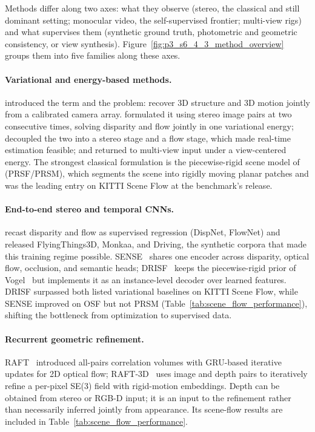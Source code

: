 Methods differ along two axes: what they observe (stereo, the classical and still dominant setting; monocular video, the self-supervised frontier; multi-view rigs) and what supervises them (synthetic ground truth, photometric and geometric consistency, or view synthesis). Figure~\ref{fig:p3_s6_4_3_method_overview} groups them into five families along these axes.

\paragraph{Variational and energy-based methods.}
\citet{vedula1999three} introduced the term and the problem: recover 3D structure and 3D motion jointly from a calibrated camera array. \citet{huguet2007variational} formulated it using stereo image pairs at two consecutive times, solving disparity and flow jointly in one variational energy; \citet{wedel2011stereoscopic} decoupled the two into a stereo stage and a flow stage, which made real-time estimation feasible; and \citet{basha2013multi} returned to multi-view input under a view-centered energy. The strongest classical formulation is the piecewise-rigid scene model of \citet{vogel20153d} (PRSF/PRSM), which segments the scene into rigidly moving planar patches and was the leading entry on KITTI Scene Flow at the benchmark's release.

\paragraph{End-to-end stereo and temporal CNNs.}
\citet{mayer2016large} recast disparity and flow as supervised regression (DispNet, FlowNet) and released FlyingThings3D, Monkaa, and Driving, the synthetic corpora that made this training regime possible. SENSE~\cite{jiang2019sense} shares one encoder across disparity, optical flow, occlusion, and semantic heads; DRISF~\cite{ma2019deep} keeps the piecewise-rigid prior of Vogel \etal\ but implements it as an instance-level decoder over learned features. DRISF surpassed both listed variational baselines on KITTI Scene Flow, while SENSE improved on OSF but not PRSM (Table~\ref{tab:scene_flow_performance}), shifting the bottleneck from optimization to supervised data.

\paragraph{Recurrent geometric refinement.}
RAFT~\cite{teed2020raft} introduced all-pairs correlation volumes with GRU-based iterative updates for 2D optical flow; RAFT-3D~\cite{teed2021raft} uses image and depth pairs to iteratively refine a per-pixel SE(3) field with rigid-motion embeddings. Depth can be obtained from stereo or RGB-D input; it is an input to the refinement rather than necessarily inferred jointly from appearance. Its scene-flow results are included in Table~\ref{tab:scene_flow_performance}.

